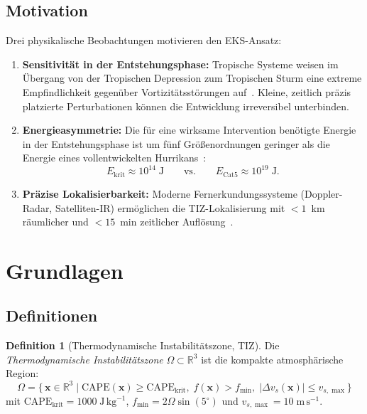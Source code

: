 ﻿\documentclass[a4paper,12pt]{article}
\theoremstyle{definition}
\newtheorem{definition}{Definition}
\begin{document}
\subsection{Motivation}

Drei physikalische Beobachtungen motivieren den EKS-Ansatz:

\begin{enumerate}
    \item \textbf{Sensitivit\"{a}t in der Entstehungsphase:}
          Tropische Systeme weisen im \"{U}bergang von der Tropischen Depression
          zum Tropischen Sturm eine extreme Empfindlichkeit gegen\"{u}ber
          Vortizit\"{a}tsst\"{o}rungen auf~\cite{gray1968}.
          Kleine, zeitlich pr\"{a}zis platzierte Perturbationen k\"{o}nnen die
          Entwicklung irreversibel unterbinden.

    \item \textbf{Energieasymmetrie:}
          Die f\"{u}r eine wirksame Intervention ben\"{o}tigte Energie in der
          Entstehungsphase ist um f\"{u}nf Gr\"{o}\ss{}enordnungen geringer als die
          Energie eines vollentwickelten Hurrikans~\cite{emanuel1994}:
          \[
              E_{\mathrm{krit}}\approx 10^{14}\;\mathrm{J}
              \qquad\text{vs.}\qquad
              E_{\mathrm{Cat5}}\approx 10^{19}\;\mathrm{J}.
          \]

    \item \textbf{Pr\"{a}zise Lokalisierbarkeit:}
          Moderne Fernerkundungssysteme (Doppler-Radar, Satelliten-IR)
          erm\"{o}glichen die TIZ-Lokalisierung mit $<1$~km r\"{a}umlicher
          und $<15$~min zeitlicher Aufl\"{o}sung~\cite{velden2005}.
\end{enumerate}

\section{Grundlagen}

\subsection{Definitionen}

\begin{definition}[Thermodynamische Instabilit\"{a}tszone, TIZ]
\label{def:tiz}
Die \emph{Thermodynamische Instabilit\"{a}tszone}
$\Omega\subset\mathbb{R}^{3}$ ist die kompakte atmosph\"{a}rische Region:
\[
    \Omega = \bigl\{\,\mathbf{x}\in\mathbb{R}^{3}\;\big|\;
    \mathrm{CAPE}(\mathbf{x})\geq\mathrm{CAPE}_{\mathrm{krit}},\;
    f(\mathbf{x})>f_{\min},\;
    |\Delta v_{s}(\mathbf{x})|\leq v_{s,\max}
    \bigr\}
\]
mit $\mathrm{CAPE}_{\mathrm{krit}}=1000\;\mathrm{J\,kg}^{-1}$,
$f_{\min}=2\Omega\sin(5^{\circ})$ und $v_{s,\max}=10\;\mathrm{m\,s}^{-1}$.
\end{definition}
\end{document}
